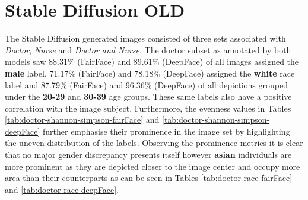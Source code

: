 {%
}
\section{Stable Diffusion OLD}\label{Eval-StableDiffusion}
The Stable Diffusion generated images consisted of three sets associated with \textit{Doctor}, \textit{Nurse} and \textit{Doctor and Nurse}. 
The doctor subset as annotated by both models saw 88.31\% (FairFace) and 89.61\% (DeepFace) of all images assigned the \textbf{male} label, 71.17\% (FairFace) and 78.18\% (DeepFace) assigned the \textbf{white} race label and 87.79\% (FairFace) and 96.36\% (DeepFace) of all depictions grouped under the \textbf{20-29} and \textbf{30-39} age groups. These same labels also have a positive correlation with the image subject. Furthermore, the evenness values in Tables \ref{tab:doctor-shannon-simpson-fairFace} and \ref{tab:doctor-shannon-simpson-deepFace} further emphasise their prominence in the image set by highlighting the uneven distribution of the labels. Observing the prominence metrics it is clear that no major gender discrepancy presents itself however \textbf{asian} individuals are more prominent as they are depicted closer to the image center and occupy more area than their counterparts as can be seen in Tables \ref{tab:doctor-race-fairFace} and \ref{tab:doctor-race-deepFace}. 


